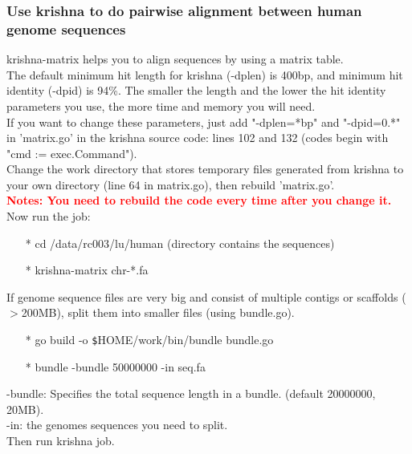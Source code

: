 \documentclass[12pt]{report}
\begin{document}
\subsubsection*{Use krishna to do pairwise alignment between human genome sequences}

krishna-matrix helps you to align sequences by using a matrix table. \\

\noindent The default minimum hit length for krishna (-dplen) is 400bp, and minimum hit identity (-dpid) is 94\%. The smaller the length and the lower the hit identity parameters you use, the more time and memory you will need. \\

\noindent If you want to change these parameters, just add "-dplen=*bp" and "-dpid=0.*" in 'matrix.go' in the krishna source code: lines 102 and 132 (codes begin with "cmd := exec.Command").\\

\noindent Change the work directory that stores temporary files generated from krishna to your own directory (line 64 in matrix.go), then rebuild 'matrix.go'. \\

\noindent\textbf{\textcolor{red}{Notes: You need to rebuild the code every time after you change it. }} \\

\noindent Now run the job:

\begin{enumerate}
	\item[*] cd /data/rc003/lu/human (directory contains the sequences)
	\item[*] krishna-matrix chr-*.fa
\end{enumerate}

\noindent If genome sequence files are very big and consist of multiple contigs or scaffolds ($>$200MB), split them into smaller files (using bundle.go).\\

\begin{enumerate}
	\item[*] go build -o \texttt{\$}HOME/work/bin/bundle bundle.go
	\item[*] bundle -bundle 50000000 -in seq.fa
\end{enumerate}

\noindent -bundle: Specifies the total sequence length in a bundle. (default 20000000, 20MB).\\
-in: the genomes sequences you need to split.\\
Then run krishna job.\\
\end{document}
